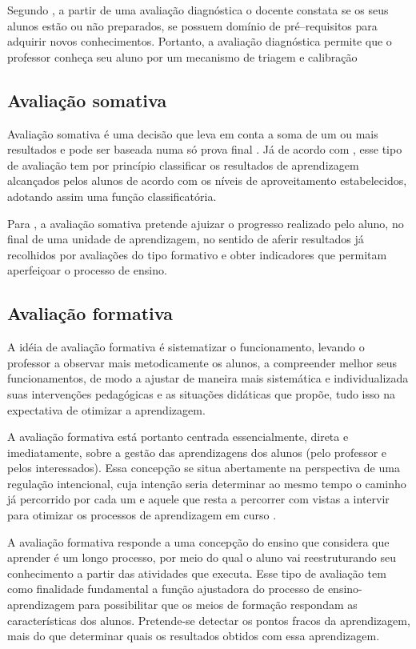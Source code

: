 \documentclass[
	12pt,				%
	openright,			%
	oneside,
	a4paper,			%
	english,			%
	french,				%
	spanish,			%
	brazil,				%
	]{abntex2}
\begin{document}
Segundo , a partir de uma avaliação diagnóstica o docente constata se os seus alunos estão ou não preparados, se possuem domínio de pré–requisitos para adquirir novos conhecimentos. Portanto, a avaliação diagnóstica permite que o professor conheça seu aluno por um mecanismo de triagem e calibração

\subsection{Avaliação somativa}
\label{sec:AvaSom}
Avaliação somativa é uma decisão que leva em conta a soma de um ou mais resultados e pode ser baseada numa só prova final \cite{e2004aprender}. Já de acordo com , esse tipo de avaliação tem por princípio classificar os resultados de aprendizagem alcançados pelos alunos de acordo com os níveis de aproveitamento estabelecidos, adotando assim uma função classificatória.

Para , a avaliação somativa pretende ajuizar o progresso realizado pelo aluno, no final de uma unidade de aprendizagem, no sentido de aferir resultados já recolhidos por avaliações do tipo formativo e obter indicadores que permitam aperfeiçoar o processo de ensino.

\subsection{Avaliação formativa}
\label{sec:AvaFor}
A idéia de avaliação formativa é sistematizar o funcionamento, levando o professor a
observar mais metodicamente os alunos, a compreender melhor seus funcionamentos, de modo
a ajustar de maneira mais sistemática e individualizada suas intervenções pedagógicas e as
situações didáticas que propõe, tudo isso na expectativa de otimizar a aprendizagem. 

A avaliação formativa está portanto centrada essencialmente, direta e imediatamente, sobre a gestão das aprendizagens dos alunos (pelo professor e pelos interessados). Essa concepção se situa abertamente na perspectiva de uma regulação intencional, cuja intenção seria determinar ao mesmo tempo o caminho já percorrido por cada um e aquele que resta a percorrer com vistas a intervir para otimizar os processos de aprendizagem em curso \cite{perrenoud1999avaliaccao}.

A avaliação formativa responde a uma concepção do ensino que considera que aprender é um longo processo, por meio do qual o aluno vai reestruturando seu conhecimento a partir das atividades que executa. Esse tipo de avaliação tem como finalidade fundamental a função ajustadora do processo de ensino-aprendizagem para possibilitar que os meios de formação respondam as características dos alunos. Pretende-se detectar os pontos fracos da aprendizagem, mais do que determinar quais os resultados obtidos com essa aprendizagem. \cite{jorba2003funccao}
\end{document}
